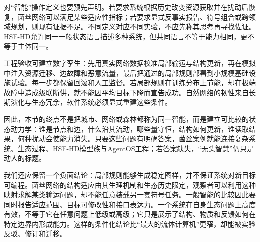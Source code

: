 对“智能”操作定义也要预先声明。若要求系统根据历史改变资源获取并在扰动后恢复，菌丝网络可以满足某些适应性指标；若要求显式反事实报告、符号组合或跨领域规划，则现有证据不足。不同定义对应不同实验，不应先称其思考再寻找佐证。HSF-HD允许同一一般状态语言描述多种系统，但共同语言不等于能力相同，更不等于主体同一。

工程验收可建立数字孪生：先用真实网络数据校准局部输运与结构更新，再在模拟中注入资源迁移、边故障和恶意流量，最后把通过的局部规则部署到小规模基础设施试验。每一步都保留回滚和人工监督。若局部规则在训练分布上节能，却在极端故障中造成级联断供，就不能因平均目标下降而宣告成功。自然网络的韧性来自长期演化与生态冗余，软件系统必须显式重建这些条件。

因此，本节的终点不是把城市、网络或森林都称为同一智能，而是建立可比较的状态动力学：谁是节点和边，什么沿其流动，哪些量守恒，结构如何更新，谁读取结果，何种扰动会使能力消失。只要这些问题有明确答案，菌丝案例就能连接复杂系统、生态过程、HSF-HD模型族与AgentOS工程；若答案缺失，“无头智慧”仍只是动人的标题。

我们还应保留一个负面结论：局部规则能够生成稳定图样，并不保证系统对新目标可编程。菌丝网络的结构适应由其生理机制和生态历史限定，观察者可以利用这种映射求解某类输运问题，却不能任意装载另一套符号任务。一般智能的比较因此要同时报告适应范围、目标可修改性和接口表达力。一个系统在自身生态问题上高度有效，不等于它在任意问题上低级或高级；它只是展示了结构、物质和反馈如何在特定边界内形成能力。这样的条件化结论比“最大的流体计算机”更窄，却能被实验反驳、修订和迁移。
